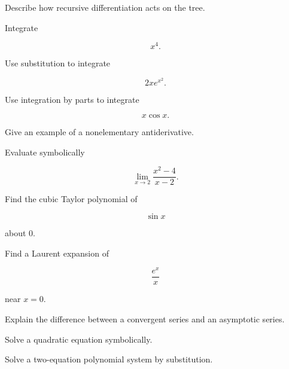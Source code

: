 \begin{exercise}[3]
Describe how recursive differentiation acts on the tree.
\end{exercise}

\begin{exercise}[2]
Integrate

\[
x^4.
\]
\end{exercise}

\begin{exercise}[3]
Use substitution to integrate

\[
2xe^{x^2}.
\]
\end{exercise}

\begin{exercise}[3]
Use integration by parts to integrate

\[
x\cos x.
\]
\end{exercise}

\begin{exercise}[3]
Give an example of a nonelementary antiderivative.
\end{exercise}

\begin{exercise}[2]
Evaluate symbolically

\[
\lim_{x\to2}
\frac{x^2-4}{x-2}.
\]
\end{exercise}

\begin{exercise}[3]
Find the cubic Taylor polynomial of

\[
\sin x
\]

about \(0\).
\end{exercise}

\begin{exercise}[3]
Find a Laurent expansion of

\[
\frac{e^x}{x}
\]

near \(x=0\).
\end{exercise}

\begin{exercise}[3]
Explain the difference between a convergent series and an asymptotic
series.
\end{exercise}

\begin{exercise}[2]
Solve a quadratic equation symbolically.
\end{exercise}

\begin{exercise}[3]
Solve a two-equation polynomial system by substitution.
\end{exercise}

